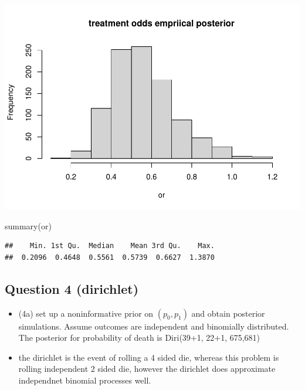 \documentclass[
]{book}
\newenvironment{Shaded}{\begin{snugshade}}{\end{snugshade}}
\newcommand{\FunctionTok}[1]{\textcolor[rgb]{0.00,0.00,0.00}{#1}}
\newcommand{\NormalTok}[1]{#1}
\providecommand{\tightlist}{%
  \setlength{\itemsep}{0pt}\setlength{\parskip}{0pt}}
\theoremstyle{definition}
\theoremstyle{definition}
\theoremstyle{definition}
\theoremstyle{definition}
\theoremstyle{remark}
\begin{document}
\includegraphics{_main_files/figure-latex/unnamed-chunk-35-1.pdf}

\begin{Shaded}
\begin{Highlighting}[]
  \FunctionTok{summary}\NormalTok{(or)}
\end{Highlighting}
\end{Shaded}

\begin{verbatim}
##    Min. 1st Qu.  Median    Mean 3rd Qu.    Max. 
##  0.2096  0.4648  0.5561  0.5739  0.6627  1.3870
\end{verbatim}

\hypertarget{question-4-dirichlet}{%
\subsection*{Question 4 (dirichlet)}\label{question-4-dirichlet}}

\begin{itemize}
\tightlist
\item
  (4a) set up a noninformative prior on \((p_0,p_1)\) and obtain posterior simulations. Assume outcomes are independent and binomially distributed. The posterior for probability of death is Diri(39+1, 22+1, 675,681)
\item
  the dirichlet is the event of rolling a 4 sided die, whereas this problem is rolling independent 2 sided die, however the dirichlet does approximate independnet binomial processes well.
\end{itemize}
\end{document}
